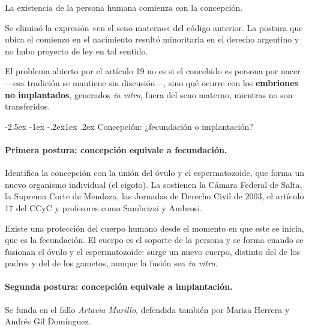 \documentclass[12pt,oneside]{book}
\makeatletter
\renewcommand\subsection{\@startsection{subsection}{2}{\z@}%
  {-2.5ex \@plus -1ex \@minus -.2ex}{1ex \@plus .2ex}%
  {\normalfont\normalsize\bfseries}}
\makeatother
\begin{document}
\begin{regla}
La existencia de la persona humana comienza con la concepción.
\end{regla}

Se eliminó la expresión «en el seno materno» del código anterior. La postura que ubica el comienzo en el nacimiento resultó minoritaria en el derecho argentino y no hubo proyecto de ley en tal sentido.

\begin{importante}
El problema abierto por el artículo 19 no es si el concebido es persona por nacer ---esa tradición se mantiene sin discusión---, sino qué ocurre con los \textbf{embriones no implantados}, generados \textit{in vitro}, fuera del seno materno, mientras no son transferidos.
\end{importante}

\subsection{Concepción: ¿fecundación o implantación?}

\paragraph{Primera postura: concepción equivale a fecundación.} Identifica la concepción con la unión del óvulo y el espermatozoide, que forma un nuevo organismo individual (el cigoto). La sostienen la Cámara Federal de Salta, la Suprema Corte de Mendoza, las Jornadas de Derecho Civil de 2003, el artículo 17 del CCyC y profesores como Sambrizzi y Ambrosi.

\begin{regla}
Existe una protección del cuerpo humano desde el momento en que este se inicia, que es la fecundación. El cuerpo es el soporte de la persona y se forma cuando se fusionan el óvulo y el espermatozoide: surge un nuevo cuerpo, distinto del de los padres y del de los gametos, aunque la fusión sea \textit{in vitro}.
\end{regla}

\paragraph{Segunda postura: concepción equivale a implantación.} Se funda en el fallo \textit{Artavia Murillo}, defendida también por Marisa Herrera y Andrés Gil Domínguez.
\end{document}
